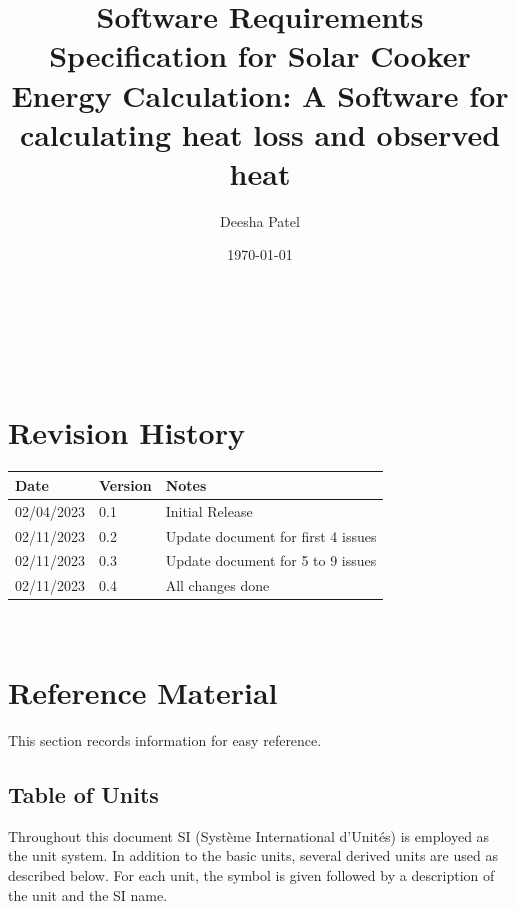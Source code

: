 \documentclass[12pt]{article}
\begin{document}
\title{Software Requirements Specification for Solar Cooker Energy Calculation: A Software for calculating heat loss and observed heat} 
\author{Deesha Patel}
\date{\today}
	
\maketitle

~\newpage


\tableofcontents

~\newpage

\section*{Revision History}

\begin{tabularx}{\textwidth}{p{3cm}p{2cm}X}
\toprule {\bf Date} & {\bf Version} & {\bf Notes}\\
\midrule
02/04/2023 & 0.1 & Initial Release\\
02/11/2023 & 0.2 & Update document for first 4 issues \\ 
02/11/2023 & 0.3 & Update document for 5 to 9 issues \\ 
02/11/2023 & 0.4 & All changes done \\
\bottomrule
\end{tabularx}

~\newpage

\section{Reference Material}

This section records information for easy reference.

\subsection{Table of Units}

Throughout this document SI (Syst\`{e}me International d'Unit\'{e}s) is employed
as the unit system.  In addition to the basic units, several derived units are
used as described below.  For each unit, the symbol is given followed by a
description of the unit and the SI name.
~\newline
\end{document}
